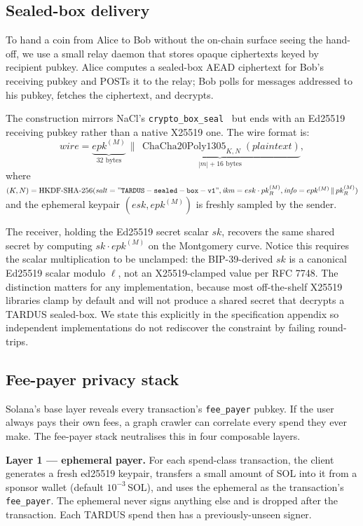 \subsection{Sealed-box delivery}
\label{sec:proto-sealedbox}

To hand a coin from Alice to Bob without the on-chain surface seeing the hand-off, we use a small relay daemon that stores opaque ciphertexts keyed by recipient pubkey. Alice computes a sealed-box AEAD ciphertext for Bob's receiving pubkey and POSTs it to the relay; Bob polls for messages addressed to his pubkey, fetches the ciphertext, and decrypts.

The construction mirrors NaCl's \texttt{crypto\_box\_seal}~\cite{nacl} but ends with an Ed25519 receiving pubkey rather than a native X25519 one. The wire format is:
\[
  \mathit{wire} = \underbrace{epk^{(M)}}_{\text{32 bytes}} \,\|\, \underbrace{\operatorname{ChaCha20Poly1305}_{K, N}(\mathit{plaintext})}_{\text{$|m| + 16$ bytes}},
\]
where $(K, N) = \operatorname{HKDF\text{-}SHA\text{-}256}(\mathit{salt} = \mathtt{"TARDUS-sealed-box-v1"}, \mathit{ikm} = esk \cdot pk_R^{(M)}, \mathit{info} = epk^{(M)} \,\|\, pk_R^{(M)})$ and the ephemeral keypair $(esk, epk^{(M)})$ is freshly sampled by the sender.

The receiver, holding the Ed25519 secret scalar $sk$, recovers the same shared secret by computing $sk \cdot epk^{(M)}$ on the Montgomery curve. Notice this requires the scalar multiplication to be unclamped: the BIP-39-derived $sk$ is a canonical Ed25519 scalar modulo $\ell$, not an X25519-clamped value per RFC 7748. The distinction matters for any implementation, because most off-the-shelf X25519 libraries clamp by default and will not produce a shared secret that decrypts a TARDUS sealed-box. We state this explicitly in the specification appendix so independent implementations do not rediscover the constraint by failing round-trips.

\subsection{Fee-payer privacy stack}
\label{sec:proto-feepayer}

Solana's base layer reveals every transaction's \texttt{fee\_payer} pubkey. If the user always pays their own fees, a graph crawler can correlate every spend they ever make. The fee-payer stack neutralises this in four composable layers.

\textbf{Layer 1 --- ephemeral payer.} For each spend-class transaction, the client generates a fresh ed25519 keypair, transfers a small amount of SOL into it from a sponsor wallet (default $10^{-3}$\,SOL), and uses the ephemeral as the transaction's \texttt{fee\_payer}. The ephemeral never signs anything else and is dropped after the transaction. Each TARDUS spend then has a previously-unseen signer.

